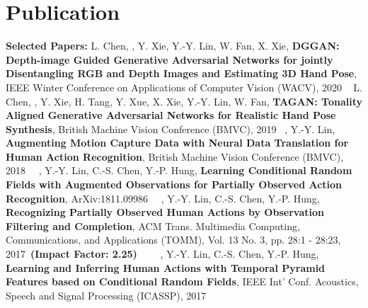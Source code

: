 
\section{Publication}
\textbf{Selected Papers:} \vspace{-3pt}
\PubItemStart
    \pubitem L. Chen, \mikelin, Y. Xie, Y.-Y. Lin, W. Fan, X. Xie, \textbf{DGGAN: Depth-image Guided Generative Adversarial Networks for jointly Disentangling RGB and Depth Images and Estimating 3D Hand Pose}, IEEE Winter Conference on Applications of Computer Vision (WACV), 2020 ~\href{http://openaccess.thecvf.com/content_WACV_2020/papers/Chen_DGGAN_Depth-image_Guided_Generative_Adversarial_Networks_forDisentangling_RGB_and_Depth_WACV_2020_paper.pdf}{\faFileTextO}
    \pubitem L. Chen, \mikelin, Y. Xie, H. Tang, Y. Xue, X. Xie, Y.-Y. Lin, W. Fan, \textbf{TAGAN: Tonality Aligned Generative Adversarial Networks for Realistic Hand Pose Synthesis}, British Machine Vision Conference (BMVC), 2019~\href{http://cvlab.citi.sinica.edu.tw/images/paper/bmvc-chen19-1.pdf}{\faFileTextO}
    \pubitem \mikelin, Y.-Y. Lin, \textbf{Augmenting Motion Capture Data with Neural Data Translation for Human Action Recognition}, British Machine Vision Conference (BMVC), 2018~\href{https://www.citi.sinica.edu.tw/papers/yylin/6363-F.pdf}{\faFileTextO}~\href{https://sites.google.com/view/action-recognition-ndt/}{\faFilm}
    \pubitem \mikelin, Y.-Y. Lin, C.-S. Chen, Y.-P. Hung, \textbf{Learning Conditional Random Fields with Augmented Observations for Partially Observed Action Recognition}, ArXiv:1811.09986~\href{https://arxiv.org/abs/1811.09986}{\faFileTextO}~\href{https://www.youtube.com/watch?v=E-vBxpUF1dU&feature=youtu.be}{\faFilm}
    \pubitem \mikelin, Y.-Y. Lin, C.-S. Chen, Y.-P. Hung, \textbf{Recognizing Partially Observed Human Actions by Observation Filtering and Completion}, ACM Trans. Multimedia Computing, Communications, and Applications (TOMM), Vol. 13 No. 3, pp. 28:1 - 28:23, 2017~\textbf{(Impact Factor: 2.25)}~\href{https://www.citi.sinica.edu.tw/papers/yylin/5891-F.pdf}{\faFileTextO}~\href{https://www.csie.ntu.edu.tw/~d00944001/videos/TOMM_introduction.mp4}{\faFilm}~\href{https://github.com/mikeshihyaolin/citi_dataset/}{\faFileCodeO}~\href{https://sites.google.com/view/citi3ddataset/}{\faDatabase}
    \pubitem \mikelin, Y.-Y. Lin, C.-S. Chen, Y.-P. Hung, \textbf{Learning and Inferring Human Actions with Temporal Pyramid Features based on Conditional Random Fields}, IEEE Int' Conf. Acoustics, Speech and Signal Processing (ICASSP), 2017~\href{http://cvlab.citi.sinica.edu.tw/images/paper/icassp-Lin17.pdf}{\faFileTextO}~\href{https://www.youtube.com/watch?v=dyNFTpIP3Tw&feature=youtu.be}{\faFilm}
